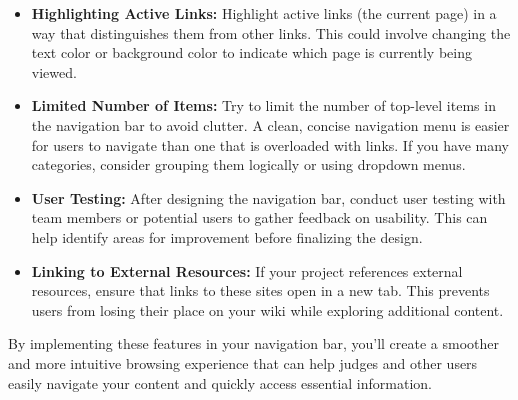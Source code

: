 \begin{itemize}
\item \textbf{Highlighting Active Links:}
Highlight active links (the current page) in a way that distinguishes them from other links.
This could involve changing the text color or background color to indicate which page is currently being viewed.

\item \textbf{Limited Number of Items:}
Try to limit the number of top-level items in the navigation bar to avoid clutter.
A clean, concise navigation menu is easier for users to navigate than one that is overloaded with links.
If you have many categories, consider grouping them logically or using dropdown menus.

\item \textbf{User Testing:}
After designing the navigation bar, conduct user testing with team members or potential users to gather feedback on usability.
This can help identify areas for improvement before finalizing the design.

\item \textbf{Linking to External Resources:}
If your project references external resources, ensure that links to these sites open in a new tab.
This prevents users from losing their place on your wiki while exploring additional content.
\end{itemize}
By implementing these features in your navigation bar, you'll create a smoother and more intuitive browsing experience that can help judges and other users easily navigate your content and quickly access essential information.



